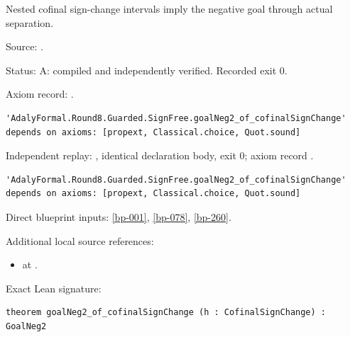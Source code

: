 \begin{theorem}[bp-079]
\label{bp-079}
\leanok
Nested cofinal sign-change intervals imply the negative goal through actual separation.

\par Source: \texttt{}.
\par Status: A: compiled and independently verified. Recorded exit 0.
\par Axiom record: \texttt{}.
\begin{verbatim}
'AdalyFormal.Round8.Guarded.SignFree.goalNeg2_of_cofinalSignChange' depends on axioms: [propext, Classical.choice, Quot.sound]
\end{verbatim}
\par Independent replay: \texttt{}, identical declaration body, exit 0; axiom record \texttt{}.
\begin{verbatim}
'AdalyFormal.Round8.Guarded.SignFree.goalNeg2_of_cofinalSignChange' depends on axioms: [propext, Classical.choice, Quot.sound]
\end{verbatim}
\par Direct blueprint inputs: \ref{bp-001}, \ref{bp-078}, \ref{bp-260}.
\par Additional local source references:
\begin{itemize}
\item \texttt{} at \texttt{}.
\end{itemize}
\par Exact Lean signature:
\begin{verbatim}
theorem goalNeg2_of_cofinalSignChange (h : CofinalSignChange) : GoalNeg2
\end{verbatim}
\end{theorem}


